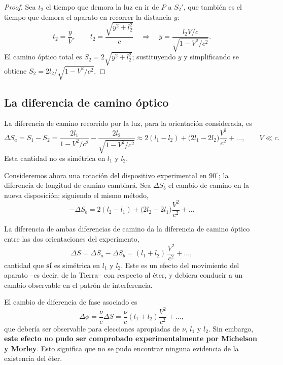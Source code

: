 \begin{proof}
Sea $t_2$ el tiempo que demora la luz en ir de $P$ a $S_2'$, que también
es el tiempo que demora el aparato en recorrer la distancia $y$:
\[
t_2 = \frac{y}{V}, \qquad t_2 = \frac{\sqrt{y^2+l_2^2}}{c}
\quad\Longrightarrow\quad y = \frac{l_2V/c}{\sqrt{1-V^2/c^2}} .
\]
El camino óptico total es $S_2=2\sqrt{y^2+l_2^2}$; sustituyendo $y$ y
simplificando se obtiene $S_2=2l_2/\sqrt{1-V^2/c^2}$. \qedhere
\end{proof}

\subsection{La diferencia de camino óptico}

\begin{proposicionc}
La diferencia de camino recorrido por la luz, para la orientación
considerada, es
\[
\Delta S_a = S_1-S_2 = \frac{2l_1}{1-V^2/c^2} - \frac{2l_2}{\sqrt{1-
V^2/c^2}} \approx 2(l_1-l_2) + \big(2l_1-2l_2\big)\frac{V^2}{c^2} +
\dots, \qquad V\ll c.
\]
Esta cantidad no es simétrica en $l_1$ y $l_2$.
\end{proposicionc}

Consideremos ahora una rotación del dispositivo experimental en
$90^\circ$; la diferencia de longitud de camino cambiará. Sea $\Delta
S_b$ el cambio de camino en la nueva disposición; siguiendo el mismo
método,
\[
-\Delta S_b = 2(l_2-l_1) + \big(2l_2-2l_1\big)\frac{V^2}{c^2} + \dots
\]

\begin{proposicionc}
La diferencia de ambas diferencias de camino da la diferencia de camino
óptico entre las dos orientaciones del experimento,
\[
\Delta S = \Delta S_a - \Delta S_b = (l_1+l_2)\,\frac{V^2}{c^2} +
\dots,
\]
cantidad que \textbf{sí} es simétrica en $l_1$ y $l_2$. Este es un
efecto del movimiento del aparato --es decir, de la Tierra-- con
respecto al éter, y debiera conducir a un cambio observable en el patrón
de interferencia.
\end{proposicionc}

El cambio de diferencia de fase asociado es
\[
\Delta\phi = \frac{\nu}{c}\Delta S = \frac{\nu}{c}(l_1+l_2)\frac{V^2}
{c^2} + \dots,
\]
que debería ser observable para elecciones apropiadas de $\nu$, $l_1$ y
$l_2$. Sin embargo, \textbf{este efecto no pudo ser comprobado
experimentalmente por Michelson y Morley}. Esto significa que no se
pudo encontrar ninguna evidencia de la existencia del éter.

